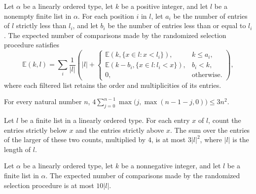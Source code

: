 \begin{theorem}
\label{Randomized.expectedComparisons_eq}
\leanok
{}
Let $\alpha$ be a linearly ordered type, let $k$ be a positive integer, and let $l$ be a
nonempty finite list in $\alpha$. For each position $i$ in $l$, let $a_i$ be the number
of entries of $l$ strictly less than $l_i$, and let $b_i$ be the number of entries less
than or equal to $l_i$. The expected number of comparisons made by the randomized
selection procedure satisfies
\[\mathbb{E}(k,l)=\sum_i \frac{1}{|l|}\left(|l|+\begin{cases}\mathbb{E}(k,\{x\in l:x<l_i\}),&k\le a_i,\\\mathbb{E}(k-b_i,\{x\in l:l_i<x\}),&b_i<k,\\0,&\text{otherwise.}\end{cases}\right),\]
where each filtered list retains the order and multiplicities of its entries.
\end{theorem}

\begin{lemma}
\label{Randomized.four_mul_sum_max_le}
\leanok
{}
For every natural number $n$, $4\sum_{j=0}^{n-1}\max\bigl(j,\max(n-1-j,0)\bigr)\le
3n^2$.
\end{lemma}

\begin{lemma}
\label{Randomized.four_mul_sum_max_countP_le}
\leanok
{}
Let $l$ be a finite list in a linearly ordered type. For each entry $x$ of $l$, count
the entries strictly below $x$ and the entries strictly above $x$. The sum over the
entries of the larger of these two counts, multiplied by $4$, is at most $3|l|^2$, where
$|l|$ is the length of $l$.
\end{lemma}

\begin{theorem}
\label{Randomized.expectedComparisons_le}
\leanok
{}
Let $\alpha$ be a linearly ordered type, let $k$ be a nonnegative integer, and let $l$
be a finite list in $\alpha$. The expected number of comparisons made by the randomized
selection procedure is at most $10|l|$.
\end{theorem}

